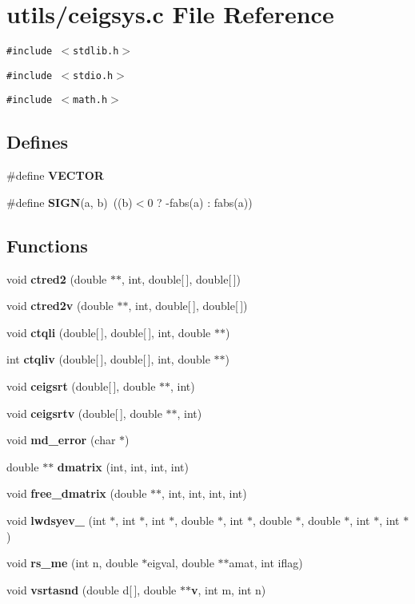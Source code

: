 \section{utils/ceigsys.c File Reference}
\label{ceigsys_8c}
{\tt \#include $<$stdlib.h$>$}\par
{\tt \#include $<$stdio.h$>$}\par
{\tt \#include $<$math.h$>$}\par
\subsection*{Defines}
\begin{CompactItemize}
\item 
\#define {\bf VECTOR}
\item 
\#define {\bf SIGN}(a, b)~((b)$<$0 ? -fabs(a) : fabs(a))
\end{CompactItemize}
\subsection*{Functions}
\begin{CompactItemize}
\item 
void {\bf ctred2} (double $\ast$$\ast$, int, double[$\,$], double[$\,$])
\item 
void {\bf ctred2v} (double $\ast$$\ast$, int, double[$\,$], double[$\,$])
\item 
void {\bf ctqli} (double[$\,$], double[$\,$], int, double $\ast$$\ast$)
\item 
int {\bf ctqliv} (double[$\,$], double[$\,$], int, double $\ast$$\ast$)
\item 
void {\bf ceigsrt} (double[$\,$], double $\ast$$\ast$, int)
\item 
void {\bf ceigsrtv} (double[$\,$], double $\ast$$\ast$, int)
\item 
void {\bf md\_\-error} (char $\ast$)
\item 
double $\ast$$\ast$ {\bf dmatrix} (int, int, int, int)
\item 
void {\bf free\_\-dmatrix} (double $\ast$$\ast$, int, int, int, int)
\item 
void {\bf lwdsyev\_\-} (int $\ast$, int $\ast$, int $\ast$, double $\ast$, int $\ast$, double $\ast$, double $\ast$, int $\ast$, int $\ast$)
\item 
void {\bf rs\_\-me} (int n, double $\ast$eigval, double $\ast$$\ast$amat, int iflag)
\item 
void {\bf vsrtasnd} (double d[$\,$], double $\ast$$\ast${\bf v}, int m, int n)
\end{CompactItemize}


